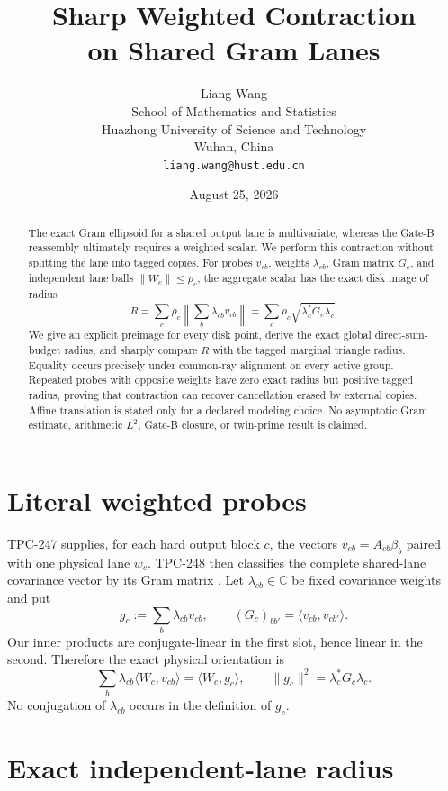 \documentclass[11pt]{article}
\title{Sharp Weighted Contraction\\
on Shared Gram Lanes}
\author{Liang Wang\\
School of Mathematics and Statistics\\
Huazhong University of Science and Technology\\
Wuhan, China\\
\texttt{liang.wang@hust.edu.cn}}
\date{August 25, 2026}
\theoremstyle{remark}
\begin{document}
\maketitle

\begin{abstract}
The exact Gram ellipsoid for a shared output lane is multivariate, whereas the
Gate-B reassembly ultimately requires a weighted scalar.  We perform this
contraction without splitting the lane into tagged copies.  For probes
$v_{cb}$, weights $\lambda_{cb}$, Gram matrix $G_c$, and independent lane balls
$\|W_c\|\leq\rho_c$, the aggregate scalar has the exact disk image of radius
\[
 R=\sum_c\rho_c\left\|\sum_b\lambda_{cb}v_{cb}\right\|
  =\sum_c\rho_c\sqrt{\lambda_c^*G_c\lambda_c}.
\]
We give an explicit preimage for every disk point, derive the exact global
direct-sum-budget radius, and sharply compare $R$ with the tagged marginal
triangle radius.  Equality occurs precisely under common-ray alignment on
every active group.  Repeated probes with opposite weights have zero exact
radius but positive tagged radius, proving that contraction can recover
cancellation erased by external copies.  Affine translation is stated only
for a declared modeling choice.  No asymptotic Gram estimate, arithmetic
$L^2$, Gate-B closure, or twin-prime result is claimed.
\end{abstract}

\section{Literal weighted probes}

TPC-247 supplies, for each hard output block $c$, the vectors
$v_{cb}=A_{cb}\beta_b$ paired with one physical lane $w_c$.  TPC-248 then
classifies the complete shared-lane covariance vector by its Gram matrix
\cite{tpc247,tpc248}.  Let $\lambda_{cb}\in\mathbb C$ be fixed covariance
weights and put
\[
 g_c:=\sum_b\lambda_{cb}v_{cb},\qquad
 (G_c)_{bb'}=\langle v_{cb},v_{cb'}\rangle.
\]
Our inner products are conjugate-linear in the first slot, hence linear in the
second.  Therefore the exact physical orientation is
\[
 \sum_b\lambda_{cb}\langle W_c,v_{cb}\rangle
 =\langle W_c,g_c\rangle,
 \qquad
 \|g_c\|^2=\lambda_c^*G_c\lambda_c.
\]
No conjugation of $\lambda_{cb}$ occurs in the definition of $g_c$.

\section{Exact independent-lane radius}
\end{document}
